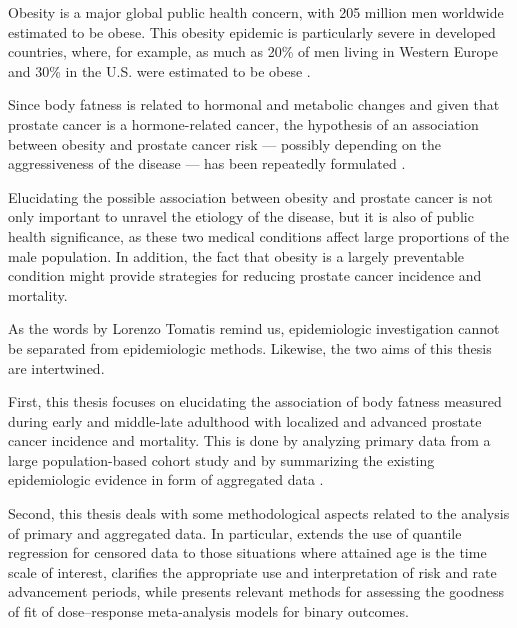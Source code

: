 Obesity is a major global public health concern, with 205 million men worldwide estimated to be obese. This obesity epidemic is particularly severe in developed countries, where, for example, as much as 20\% of men living in Western Europe and 30\% in the U.S. were estimated to be obese \citep{finucane_national_2011}.

Since body fatness is related to hormonal and metabolic changes and given that prostate cancer is a hormone-related cancer, the hypothesis of an association between obesity and prostate cancer risk --- possibly depending on the aggressiveness of the disease --- has been repeatedly formulated \citep{hsing_obesity_2007}. 

Elucidating the possible association between obesity and prostate cancer is not only important to unravel the etiology of the disease, but it is also of public health significance, as these two medical conditions affect large proportions of the male population. In addition, the fact that obesity is a largely preventable condition might provide strategies for reducing prostate cancer incidence and mortality.

\bigskip
\bigskip

   
As the words by Lorenzo Tomatis remind us, epidemiologic investigation cannot be separated from epidemiologic methods. Likewise, the two aims of this thesis are intertwined. 

First, this thesis focuses on elucidating the association of body fatness measured during early and middle-late adulthood with localized and advanced prostate cancer incidence and mortality. This is done by analyzing primary data from a large population-based cohort study  and by summarizing the existing epidemiologic evidence in form of aggregated data .

Second, this thesis deals with some methodological aspects related to the analysis of primary and aggregated data. In particular,  extends the use of quantile regression for censored data to those situations where attained age is the time scale of interest,  clarifies the appropriate use and interpretation of risk and rate advancement periods, while  presents relevant methods for assessing the goodness of fit of dose--response meta-analysis models for binary outcomes.
 
